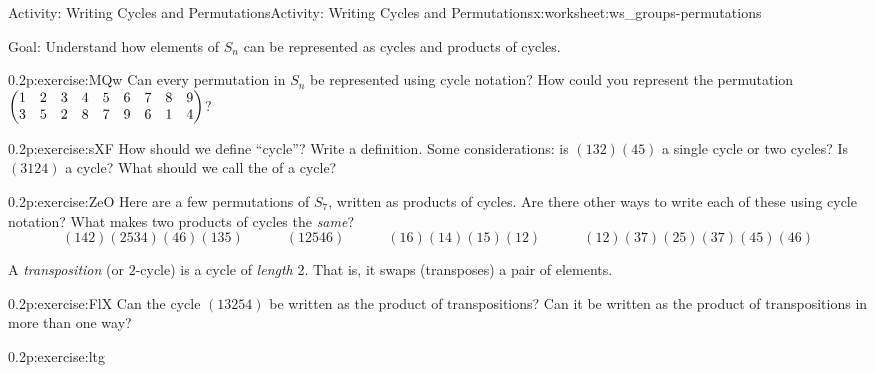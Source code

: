 \documentclass[11pt]{book}
\begin{document}
%
%
\typeout{************************************************}
\typeout{************************************************}
%
\begin{worksheet-subsection}{Activity: Writing Cycles and Permutations}{}{Activity: Writing Cycles and Permutations}{}{}{x:worksheet:ws_groups-permutations}
\begin{introduction}{}%
Goal: Understand how elements of \(S_n\) can be represented as cycles and products of cycles.%
\end{introduction}%
\begin{divisionexercise}{1}{}{0.2}{p:exercise:MQw}%
Can every permutation in \(S_n\) be represented using cycle notation?  How could you represent the permutation \(\begin{pmatrix}1 & 2 & 3 & 4 & 5 & 6 & 7 & 8 & 9 \\ 3 & 5 & 2 & 8 & 7 & 9 & 6 & 1 & 4  \end{pmatrix}\)?%
\end{divisionexercise}%
\begin{divisionexercise}{2}{}{0.2}{p:exercise:sXF}%
How should we define ``cycle''?  Write a definition.  Some considerations: is \((132)(45)\) a single cycle or two cycles?  Is \((3124)\) a cycle?  What should we call the  of a cycle?%
\end{divisionexercise}%
\begin{divisionexercise}{3}{}{0.2}{p:exercise:ZeO}%
Here are a few permutations of \(S_7\), written as products of cycles.  Are there other ways to write each of these using cycle notation?  What makes two products of cycles the \emph{same}?%
\begin{equation*}
(142)(2534)(46)(135) \qquad\quad (12546) \qquad\quad (16)(14)(15)(12) \qquad\quad (12)(37)(25)(37)(45)(46)
\end{equation*}
%
\end{divisionexercise}%
\clearpage
A \emph{transposition} (or \(2\)-cycle) is a cycle of \emph{length} 2.  That is, it swaps (transposes) a pair of elements.%
\begin{divisionexercise}{4}{}{0.2}{p:exercise:FlX}%
Can the cycle \((13254)\) be written as the product of transpositions?  Can it be written as the product of transpositions in more than one way?%
\end{divisionexercise}%
\begin{divisionexercise}{5}{}{0.2}{p:exercise:ltg}%

\end{divisionexercise}
\end{worksheet-subsection}
\end{document}
